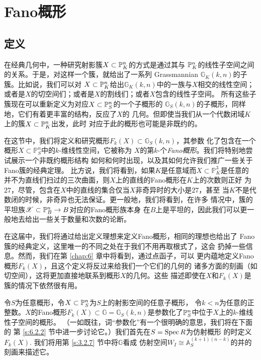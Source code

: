 \section{Fano概形}\label{s:4.3}
\subsection{定义}\label{s:4.3.1}

在经典几何中，一种研究射影簇$X\subset \bbp_K^n$的方式是通过其与
$\bbp_K^n$的线性子空间之间的关系。于是，对这样一个簇，就给出了一系列
Grassmannian $\mathbb G_K(k,n)$的子簇。比如说，我们可以对
$X\subset \bbp_K^n$给出$\mathbb G_K(k,n)$中的一族与$X$相交的线性空间；
或者是$X$的切空间们；或者是$X$的割线们；或者$X$包含的线性子空间。
所有这些子簇现在可以重新定义为对应$X\subset \bbp_S^n$的一个子概形的
$\mathbb G_S(k,n)$的子概形，同样地，它们有着更丰富的结构，反应了$X$的
几何。但即使当我们从一个代数闭域$K$上的簇$X\subset \bbp_K^n$出发，此时
对应于此的概形也可能是非既约的。

在这节中，我们将定义和研究概形$F_k(X)\subset \mathbb G_S(k,n)$，其参数
化了包含在一个概形$X\subset \mathbb P_S^n$中的$k$-维线性空间，它被称为
$X$的第$k$-个\textit{Fano概形}。我们将特别地尝试展示一个非既约概形结构
如何和何时出现，以及其如何允许我们推广一些关于Fano簇的经典定理。
比方说，我们将看到，如果$K$是任意域而$X\subset \mathbb P_K^3$是任意的
并不为直线们扫过的三次曲面，则$X$上的直线的Fano概形在$K$上的次数则正好
为$27$，尽管，包含在$X$中的直线的集合仅当$X$非奇异时的大小是$27$，甚至
当$K$不是代数闭的时候，非奇异也无法保证。更一般地，我们将看到，在许多
情况中，簇的平坦族$\mathscr X\subset \P_B^n\to B$对应的Fano概形族本身
在$B$上是平坦的，因此我们可以更一般地去给出一些关于数量和次数的论断。

在这届中，我们将通过给出定义理想来定义Fano概形，相同的理想也给出了
Fano簇的经典定义，这里唯一的不同之处在于我们不用再取根式了，这会
扔掉一些信息。然而，我们在第 \ref{chap:6} 章中将看到，通过点函子，可以
更内蕴地定义Fano概形$F_k(X)$，且这个定义将反过来给我们一个它们的几何的
诸多方面的刻画（如切空间），这将更加直接地联系到概形$X$的几何。这些
描述即使在$X$和$F_k(X)$是簇的情况下依然很有用。


令$S$为任意概形，令$X\subset \P_S^n$为$S$上的射影空间的任意子概形，
令$k<n$为任意的正整数。$X$的Fano概形$F_k(X)\subset \mathbb G=
\mathbb G_S(k,n)$是参数化了$\P_S^n$中位于$X$上的$k$-维线性子空间的概形。
（一如既往，词“参数化”有一个很明确的意思，我们将在下面的
第 \ref{s:6.2.2} 节中进一步讨论它。）我们首先在$S=\spec R$为仿射概形
的时定义$F_k(X)$. 我们将用第 \ref{s:3.2.7} 节中将$\mathbb G$看成
仿射空间$W_I\cong \mathbb A_S^{(k+1)(n-k)}$的并的刻画来描述它。


